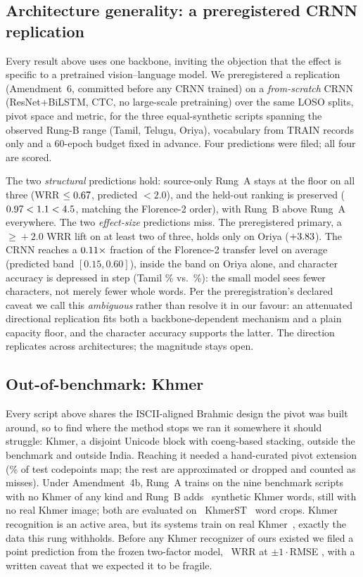 \subsection{Architecture generality: a preregistered CRNN replication}
\label{sec:crnn}

Every result above uses one backbone, inviting the objection that the effect is specific to a
pretrained vision--language model. We preregistered a replication (Amendment~6, committed before
any CRNN trained) on a \emph{from-scratch} CRNN (ResNet+BiLSTM, CTC, no large-scale pretraining)
over the same LOSO splits, pivot space and metric, for the three equal-synthetic scripts
spanning the observed Rung-B range (Tamil, Telugu, Oriya), vocabulary from TRAIN records only and a
60-epoch budget fixed in advance. Four predictions were filed; all four are scored.

The two \emph{structural} predictions hold: source-only Rung~A stays at the floor on all three
(WRR $\le0.67$, predicted $<2.0$), and the held-out ranking is preserved
($0.97<1.1<4.5$, matching the Florence-2 order), with Rung~B above Rung~A
everywhere. The two \emph{effect-size} predictions miss. The preregistered primary, a
$\ge\!+2.0$ WRR lift on at least two of three, holds only on Oriya ($+3.83$). The CRNN
reaches a $0.11\times$ fraction of the Florence-2 transfer level on average (predicted
band $[0.15,0.60]$), inside the band on Oriya alone, and character accuracy is depressed in step
(Tamil \crnnChaBtamil\% vs.\ \chaBtamil\%): the small model sees fewer characters, not merely fewer
whole words. Per the preregistration's declared caveat we call this \emph{ambiguous} rather than
resolve it in our favour: an attenuated directional replication fits both a backbone-dependent
mechanism and a plain capacity floor, and the character accuracy supports the latter. The
direction replicates across architectures; the magnitude stays open.

\subsection{Out-of-benchmark: Khmer}
\label{sec:khmer}

Every script above shares the ISCII-aligned Brahmic design the pivot was built around, so to find
where the method stops we ran it somewhere it should struggle: Khmer, a disjoint Unicode block with
coeng-based stacking, outside the benchmark and outside India. Reaching it needed a hand-curated
pivot extension (\khmerMapRate\% of test codepoints map; the rest are approximated or dropped and
counted as misses). Under Amendment~4b, Rung~A trains on the nine benchmark scripts with no Khmer
of any kind and Rung~B adds \khmerSynth\ synthetic Khmer words, still with no real Khmer image;
both are evaluated on \khmerN\ KhmerST~\cite{khmerst} word crops. Khmer recognition is an active
area, but its systems train on real Khmer~\cite{univkhmer}, exactly the data this rung withholds. Before any Khmer
recognizer of ours existed we filed a point prediction from the frozen two-factor model,
\khmerPred\ WRR at $\pm1\cdot$RMSE \khmerBandOne, with a written caveat that we expected it to be
fragile.


